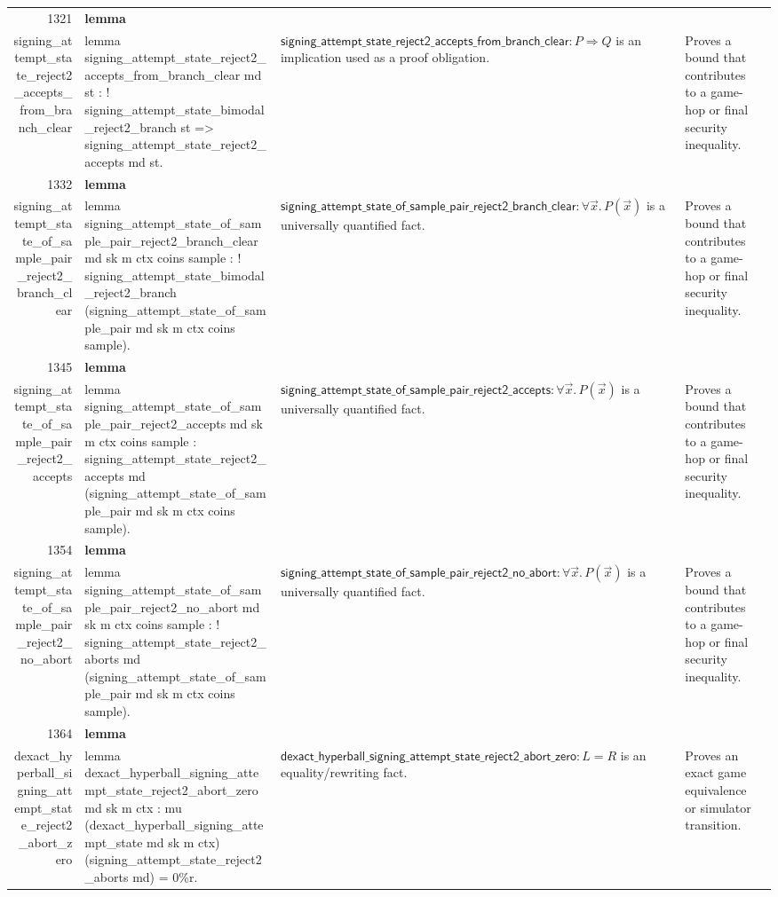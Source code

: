 \documentclass[10pt]{article}
\newcommand{\ec}[1]{\begingroup\ttfamily\scriptsize #1\endgroup}
\begin{document}
\begin{longtable}{r L{0.17\textwidth} L{0.26\textwidth} L{0.27\textwidth} L{0.20\textwidth}}
1321 & \textbf{lemma}\\\ec{signing\_attempt\_state\_reject2\_accepts\_from\_branch\_clear} & \ec{lemma signing\_attempt\_state\_reject2\_accepts\_from\_branch\_clear md st : ! signing\_attempt\_state\_bimodal\_reject2\_branch st => signing\_attempt\_state\_reject2\_accepts md st.} & \(\mathsf{signing\_attempt\_state\_reject2\_accepts\_from\_branch\_clear} : P \Rightarrow Q\) is an implication used as a proof obligation. & Proves a bound that contributes to a game-hop or final security inequality. \\
1332 & \textbf{lemma}\\\ec{signing\_attempt\_state\_of\_sample\_pair\_reject2\_branch\_clear} & \ec{lemma signing\_attempt\_state\_of\_sample\_pair\_reject2\_branch\_clear md sk m ctx coins sample : ! signing\_attempt\_state\_bimodal\_reject2\_branch (signing\_attempt\_state\_of\_sample\_pair md sk m ctx coins sample).} & \(\mathsf{signing\_attempt\_state\_of\_sample\_pair\_reject2\_branch\_clear} : \forall \vec{x}.\, P(\vec{x})\) is a universally quantified fact. & Proves a bound that contributes to a game-hop or final security inequality. \\
1345 & \textbf{lemma}\\\ec{signing\_attempt\_state\_of\_sample\_pair\_reject2\_accepts} & \ec{lemma signing\_attempt\_state\_of\_sample\_pair\_reject2\_accepts md sk m ctx coins sample : signing\_attempt\_state\_reject2\_accepts md (signing\_attempt\_state\_of\_sample\_pair md sk m ctx coins sample).} & \(\mathsf{signing\_attempt\_state\_of\_sample\_pair\_reject2\_accepts} : \forall \vec{x}.\, P(\vec{x})\) is a universally quantified fact. & Proves a bound that contributes to a game-hop or final security inequality. \\
1354 & \textbf{lemma}\\\ec{signing\_attempt\_state\_of\_sample\_pair\_reject2\_no\_abort} & \ec{lemma signing\_attempt\_state\_of\_sample\_pair\_reject2\_no\_abort md sk m ctx coins sample : ! signing\_attempt\_state\_reject2\_aborts md (signing\_attempt\_state\_of\_sample\_pair md sk m ctx coins sample).} & \(\mathsf{signing\_attempt\_state\_of\_sample\_pair\_reject2\_no\_abort} : \forall \vec{x}.\, P(\vec{x})\) is a universally quantified fact. & Proves a bound that contributes to a game-hop or final security inequality. \\
1364 & \textbf{lemma}\\\ec{dexact\_hyperball\_signing\_attempt\_state\_reject2\_abort\_zero} & \ec{lemma dexact\_hyperball\_signing\_attempt\_state\_reject2\_abort\_zero md sk m ctx : mu (dexact\_hyperball\_signing\_attempt\_state md sk m ctx) (signing\_attempt\_state\_reject2\_aborts md) = 0\%r.} & \(\mathsf{dexact\_hyperball\_signing\_attempt\_state\_reject2\_abort\_zero} : L = R\) is an equality/rewriting fact. & Proves an exact game equivalence or simulator transition. \\

\end{longtable}
\end{document}
